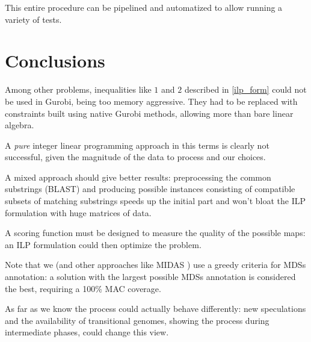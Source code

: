 This entire procedure can be pipelined and automatized to allow running a variety of tests.
\clearpage


\section{Conclusions}
Among other problems, inequalities like $1$ and $2$ described in \ref{ilp_form} could not be used in Gurobi, being too memory aggressive. They had to be replaced with constraints built using native Gurobi methods, allowing more than bare linear algebra.

A \textit{pure} integer linear programming approach in this terms is clearly not successful, given the magnitude of the data to process and our choices.

A mixed approach should give better results: preprocessing the common substrings (BLAST) and producing possible instances consisting of compatible subsets of matching substrings speeds up the initial part and won't bloat the ILP formulation with huge matrices of data.

A scoring function must be designed to measure the quality of the possible maps: an ILP formulation could then optimize the problem.

Note that we (and other approaches like MIDAS \cite{midas}) use a greedy criteria for MDSs annotation: a solution with the largest possible MDSs annotation is considered the best, requiring a 100\% MAC coverage.

As far as we know the process could actually behave differently: new speculations and the availability of transitional genomes, showing the process during intermediate phases, could change this view.